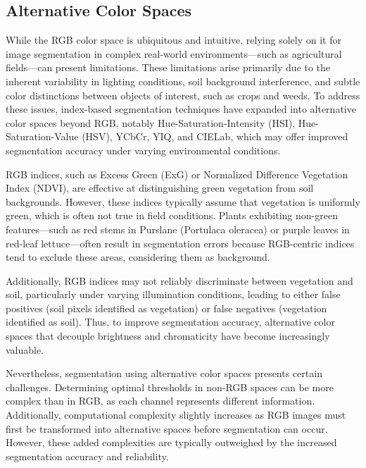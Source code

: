 \documentclass[letterpaper]{report}
\begin{document}
{\subsection{Alternative Color Spaces}
While the RGB color space is ubiquitous and intuitive, relying solely on it for image segmentation in complex real-world environments—such as agricultural fields—can present limitations. These limitations arise primarily due to the inherent variability in lighting conditions, soil background interference, and subtle color distinctions between objects of interest, such as crops and weeds. To address these issues, index-based segmentation techniques have expanded into alternative color spaces beyond RGB, notably Hue-Saturation-Intensity (HSI), Hue-Saturation-Value (HSV), YCbCr, YIQ, and CIELab, which may offer improved segmentation accuracy under varying environmental conditions.

RGB indices, such as Excess Green (ExG) or Normalized Difference Vegetation Index (NDVI), are effective at distinguishing green vegetation from soil backgrounds. However, these indices typically assume that vegetation is uniformly green, which is often not true in field conditions. Plants exhibiting non-green features—such as red stems in Purslane (Portulaca oleracea) or purple leaves in red-leaf lettuce—often result in segmentation errors because RGB-centric indices tend to exclude these areas, considering them as background.

Additionally, RGB indices may not reliably discriminate between vegetation and soil, particularly under varying illumination conditions, leading to either false positives (soil pixels identified as vegetation) or false negatives (vegetation identified as soil). Thus, to improve segmentation accuracy, alternative color spaces that decouple brightness and chromaticity have become increasingly valuable.

Nevertheless, segmentation using alternative color spaces presents certain challenges. Determining optimal thresholds in non-RGB spaces can be more complex than in RGB, as each channel represents different information. Additionally, computational complexity slightly increases as RGB images must first be transformed into alternative spaces before segmentation can occur. However, these added complexities are typically outweighed by the increased segmentation accuracy and reliability.

}
\end{document}
